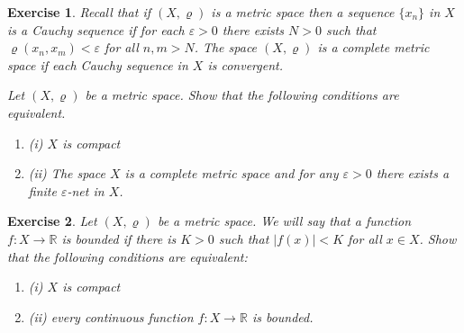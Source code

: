 \documentclass[11pt, letterpaper, oneside]{report}
\theoremstyle{pplain}
\newtheorem{ITERMVALUE THM}[theorem]{Intermediate Value Theorem}
\newtheorem{HEINEBOREL THM}[theorem]{Heine-Borel Theorem}
\newtheorem{UMETR THM}[theorem]{Urysohn Metrization Theorem}
\newtheorem{UMETR2 THM}[theorem]{Urysohn Metrization Theorem (v.2)}
\theoremstyle{ddefinition}
\theoremstyle{nnn}
\newtheorem{TDA NN}[theorem]{Topological Data Analysis. }
\theoremstyle{eexercise}
\newtheorem{exercise}{Exercise}[chapter]
\newcommand{\R}{{\mathbb R}}
\newcommand{\benu}{\begin{enumerate}}
\newcommand{\eenu}{\end{enumerate}}
\begin{document}
\begin{exercise}
Recall that if $(X, \varrho)$ is a metric space then a sequence $\{x_{n}\}$ in $X$ is a Cauchy sequence
if for each $\varepsilon > 0$ there exists $N > 0$ such that $\varrho(x_{n}, x_{m}) < \varepsilon$
for all $n, m > N$. The space $(X, \varrho)$ is a \emph{complete metric space} if each Cauchy sequence 
in $X$ is convergent.  

Let $(X, \varrho)$ be a metric space. Show that the following conditions are equivalent.
\benu
\item[(i)] $X$ is compact
\item[(ii)] The space $X$ is a complete metric space and for any $\varepsilon >0$ there exists 
a finite $\varepsilon$-net in $X$. 
\eenu
\end{exercise}




\begin{exercise}
Let $(X, \varrho)$ be a metric space. We will say that a function $f\colon X\to \R$ is \emph{bounded}
if there is $K > 0$ such that $|f(x)| < K$ for all $x\in X$. Show that the following conditions are equivalent:
\benu
\item[(i)] $X$ is compact 
\item[(ii)] every continuous function $f\colon X \to \R$ is bounded.
\eenu
\end{exercise}
\end{document}
